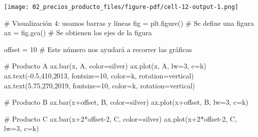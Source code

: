 \documentclass[
  letterpaper,
  DIV=11,
  numbers=noendperiod]{scrreprt}
\newenvironment{Shaded}{\begin{snugshade}}{\end{snugshade}}
\newcommand{\CommentTok}[1]{\textcolor[rgb]{0.37,0.37,0.37}{#1}}
\newcommand{\DecValTok}[1]{\textcolor[rgb]{0.68,0.00,0.00}{#1}}
\newcommand{\FloatTok}[1]{\textcolor[rgb]{0.68,0.00,0.00}{#1}}
\newcommand{\NormalTok}[1]{\textcolor[rgb]{0.00,0.23,0.31}{#1}}
\newcommand{\OperatorTok}[1]{\textcolor[rgb]{0.37,0.37,0.37}{#1}}
\newcommand{\StringTok}[1]{\textcolor[rgb]{0.13,0.47,0.30}{#1}}
\begin{document}
\texttt{[image: 02\_precios\_producto\_files/figure-pdf/cell-12-output-1.png]}

\begin{Shaded}
\begin{Highlighting}[]
\CommentTok{\# Visualización 4: usamos barras y líneas}
\NormalTok{fig }\OperatorTok{=}\NormalTok{ plt.figure() }\CommentTok{\# Se define una figura}
\NormalTok{ax }\OperatorTok{=}\NormalTok{ fig.gca()     }\CommentTok{\# Se obtienen los ejes de la figura}

\NormalTok{offset }\OperatorTok{=} \DecValTok{10} \CommentTok{\# Este número nos ayudará a recorrer las gráficas}

\CommentTok{\# Producto A}
\NormalTok{ax.bar(x, A, color}\OperatorTok{=}\StringTok{\textquotesingle{}silver\textquotesingle{}}\NormalTok{)}
\NormalTok{ax.plot(x, A, lw}\OperatorTok{=}\DecValTok{3}\NormalTok{, c}\OperatorTok{=}\StringTok{\textquotesingle{}k\textquotesingle{}}\NormalTok{)}
\NormalTok{ax.text(}\OperatorTok{{-}}\FloatTok{0.5}\NormalTok{,}\DecValTok{410}\NormalTok{,}\StringTok{\textquotesingle{}2013\textquotesingle{}}\NormalTok{, fontsize}\OperatorTok{=}\DecValTok{10}\NormalTok{, color}\OperatorTok{=}\StringTok{\textquotesingle{}k\textquotesingle{}}\NormalTok{, rotation}\OperatorTok{=}\StringTok{\textquotesingle{}vertical\textquotesingle{}}\NormalTok{)}
\NormalTok{ax.text(}\FloatTok{5.75}\NormalTok{,}\DecValTok{270}\NormalTok{,}\StringTok{\textquotesingle{}2019\textquotesingle{}}\NormalTok{, fontsize}\OperatorTok{=}\DecValTok{10}\NormalTok{, color}\OperatorTok{=}\StringTok{\textquotesingle{}k\textquotesingle{}}\NormalTok{, rotation}\OperatorTok{=}\StringTok{\textquotesingle{}vertical\textquotesingle{}}\NormalTok{)}

\CommentTok{\# Producto B}
\NormalTok{ax.bar(x}\OperatorTok{+}\NormalTok{offset, B, color}\OperatorTok{=}\StringTok{\textquotesingle{}silver\textquotesingle{}}\NormalTok{)}
\NormalTok{ax.plot(x}\OperatorTok{+}\NormalTok{offset, B, lw}\OperatorTok{=}\DecValTok{3}\NormalTok{, c}\OperatorTok{=}\StringTok{\textquotesingle{}k\textquotesingle{}}\NormalTok{)}

\CommentTok{\# Producto C}
\NormalTok{ax.bar(x}\OperatorTok{+}\DecValTok{2}\OperatorTok{*}\NormalTok{offset}\OperatorTok{{-}}\DecValTok{2}\NormalTok{, C, color}\OperatorTok{=}\StringTok{\textquotesingle{}silver\textquotesingle{}}\NormalTok{)}
\NormalTok{ax.plot(x}\OperatorTok{+}\DecValTok{2}\OperatorTok{*}\NormalTok{offset}\OperatorTok{{-}}\DecValTok{2}\NormalTok{, C, lw}\OperatorTok{=}\DecValTok{3}\NormalTok{, c}\OperatorTok{=}\StringTok{\textquotesingle{}k\textquotesingle{}}\NormalTok{)}


\end{Highlighting}
\end{Shaded}
\end{document}
